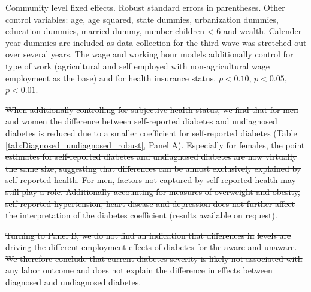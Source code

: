 \documentclass[12pt,english]{article}
\providecommand{\DIFaddtex}[1]{{\protect\color{blue}\uwave{#1}}} %
\providecommand{\DIFdeltex}[1]{{\protect\color{red}\sout{#1}}}                      %
\providecommand{\DIFdelbegin}{} %
\providecommand{\DIFaddFL}[1]{\DIFadd{#1}} %
\providecommand{\DIFaddbeginFL}{} %
\providecommand{\DIFaddendFL}{} %
\providecommand{\DIFadd}[1]{\texorpdfstring{\DIFaddtex{#1}}{#1}} %
\providecommand{\DIFdel}[1]{\texorpdfstring{\DIFdeltex{#1}}{}} %
\begin{document}
\begin{table}[h]
\begin{center}
\begin{adjustbox}{max width=\linewidth}
\begin{threeparttable}
{\begin{tabular}{l*{6}{S
S}}
\bottomrule
\end{tabular}
\begin{tablenotes}
\item \DIFaddbeginFL \footnotesize \textit{\DIFaddFL{Notes}} \DIFaddendFL Community level fixed effects. Robust standard errors in parentheses. Other control variables: age, age squared, state dummies, urbanization dummies, education dummies, married dummy, number children < 6 and wealth. Calender year dummies are included as data collection for the third wave was stretched out over several years. The wage and working hour models additionally control for type of work (agricultural and self employed with non-agricultural wage employment as the base) and for health insurance status. \sym{*} \(p<0.10\), \sym{**} \(p<0.05\), \sym{***} \(p<0.01\).
\end{tablenotes}
}
\end{threeparttable}
\end{adjustbox}
\end{center}
\end{table}

\DIFdelbegin \DIFdel{When additionally controlling for subjective health status, we find that for men and women the difference between self-reported diabetes and undiagnosed diabetes is reduced due to a smaller coefficient for self-reported diabetes (Table \ref{tab:Diagnosed_undiagnosed_robust}, Panel A). Especially for females, the point estimates for self-reported diabetes and undiagnosed diabetes are now virtually the same size, suggesting that differences can be almost exclusively explained by self-reported health. For men, factors not captured by self-reported health may still play a role. Additionally accounting for measures of overweight and obesity, self-reported hypertension, heart disease and depression does not further affect the interpretation of the diabetes coefficient (results available on request).
}%

\DIFdel{Turning to Panel B, we do not find an indication that differences in }%
\DIFdel{levels are driving the different employment effects of diabetes for the aware and unaware. We therefore conclude that current diabetes severity is likely not associated with any labor outcome and does not explain the difference in effects between diagnosed and undiagnosed diabetes.
}%
\end{document}

